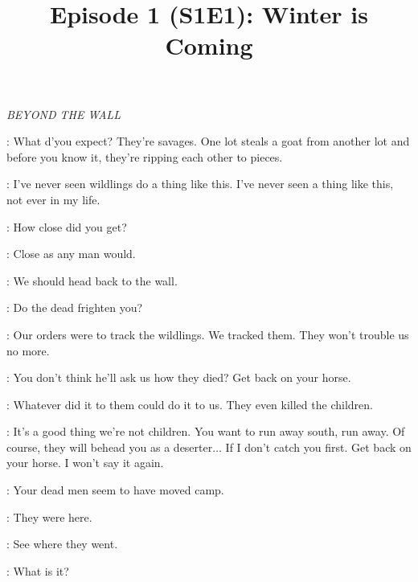 

\title{Episode 1 (S1E1): Winter is Coming}
\author{}
\date{}
\maketitle




\scene

\textit{BEYOND THE WALL} 


\ROYCE: What d'you expect? They're savages. One lot steals a goat from another lot and before you know it, they're ripping each other to pieces. 

\WILL: I've never seen wildlings do a thing like this. I've never seen a thing like this, not ever in my life. 

\ROYCE: How close did you get? 

\WILL: Close as any man would. 

\GARED: We should head back to the wall. 

\ROYCE: Do the dead frighten you? 

\GARED: Our orders were to track the wildlings. We tracked them. They won't trouble us no more. 

\ROYCE: You don't think he'll ask us how they died? Get back on your horse. 

\WILL: Whatever did it to them could do it to us. They even killed the children. 

\ROYCE: It's a good thing we're not children. You want to run away south, run away. Of course, they will behead you as a deserter$\ldots$ If I don't catch you first. Get back on your horse. I won't say it again. 


\ROYCE: Your dead men seem to have moved camp. 

\WILL: They were here. 

\GARED: See where they went. 


\ROYCE: What is it? 


